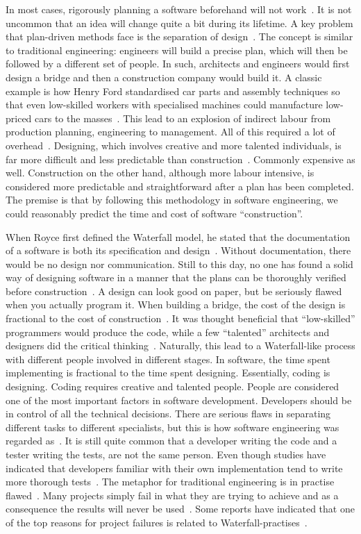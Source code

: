 \documentclass[english]{tktltiki2}
\begin{document}
In most cases, rigorously planning a software beforehand will not work~\cite{LB03}. It is not uncommon that an idea will change quite a bit during its lifetime. A key problem that plan-driven  methods face is the separation of design~\cite{LB03, Fow05}. The concept is similar to traditional engineering: engineers will build a precise plan, which will then be followed by a different set of people. In such, architects and engineers would first design a bridge and then a construction company would build it. A classic example is how Henry Ford standardised car parts and assembly techniques so that even low-skilled workers with specialised machines could manufacture low-priced cars to the masses~\cite{Pop02}. This lead to an explosion of indirect labour from production planning, engineering to management. All of this required a lot of overhead~\cite{Pop02}. Designing, which involves creative and more talented individuals, is far more difficult and less predictable than construction~\cite{Fow05}. Commonly expensive as well. Construction on the other hand, although more labour intensive, is considered more predictable and straightforward after a plan has been completed. The premise is that by following this methodology in software engineering, we could reasonably predict the time and cost of software “construction”.

When Royce first defined the Waterfall model, he stated that the documentation of a software is both its specification and design~\cite{Roy70}. Without documentation, there would be no design nor communication. Still to this day, no one has found a solid way of designing software in a manner that the plans can be thoroughly verified before construction~\cite{Fow05}. A design can look good on paper, but be seriously flawed when you actually program it. When building a bridge, the cost of the design is fractional to the cost of construction~\cite{Fow05}. It was thought beneficial that “low-skilled” programmers would produce the code, while a few “talented” architects and designers did the critical thinking~\cite{Pop02}. Naturally, this lead to a Waterfall-like process with different people involved in different stages. In software, the time spent implementing is fractional to the time spent designing. Essentially, coding is designing. Coding requires creative and talented people. People are considered one of the most important factors in software development. Developers should be in control of all the technical decisions. There are serious flaws in separating different tasks to different specialists, but this is how software engineering was regarded as~\cite{Roy70}. It is still quite common that a developer writing the code and a tester writing the tests, are not the same person. Even though studies have indicated that developers familiar with their own implementation tend to write more thorough tests~\cite{MND09}. The metaphor for traditional engineering is in practise flawed~\cite{Fow05}. Many projects simply fail in what they are trying to achieve and as a consequence the results will never be used~\cite{LB03}. Some reports have indicated that one of the top reasons for project failures is related to Waterfall-practises~\cite{LB03}.
\end{document}
